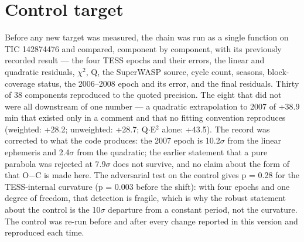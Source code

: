 \documentclass{aa}
\begin{document}
\section{Control target}\label{a:B}
Before any new target was measured, the chain was run as a single function on TIC 142874476 and compared, component by component, with its previously recorded result --- the four TESS epochs and their errors, the linear and quadratic residuals, $\chi^2$, Q, the SuperWASP source, cycle count, seasons, block-coverage status, the 2006--2008 epoch and its error, and the final residuals. Thirty of 38 components reproduced to the quoted precision. The eight that did not were all downstream of one number --- a quadratic extrapolation to 2007 of +38.9 min that existed only in a comment and that no fitting convention reproduces (weighted: +28.2; unweighted: +28.7; Q$\cdot$E$^2$ alone: +43.5). The record was corrected to what the code produces: the 2007 epoch is 10.2$\sigma$ from the linear ephemeris and 2.4$\sigma$ from the quadratic; the earlier statement that a pure parabola was rejected at 7.9$\sigma$ does not survive, and no claim about the form of that O$-$C is made here. The adversarial test on the control gives p = 0.28 for the TESS-internal curvature (p = 0.003 before the shift): with four epochs and one degree of freedom, that detection is fragile, which is why the robust statement about the control is the 10$\sigma$ departure from a constant period, not the curvature. The control was re-run before and after every change reported in this version and reproduced each time.
\end{document}
